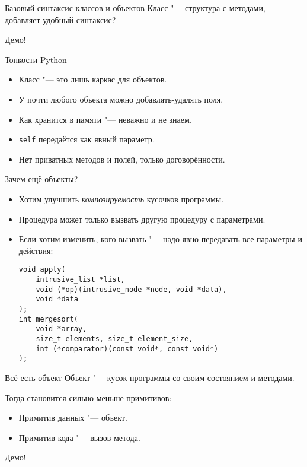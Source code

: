 \begin{frame}[t]{Базовый синтаксис классов и объектов}
Класс "--- структура с методами, добавляет удобный синтаксис?

Демо!
\end{frame}

\begin{frame}[t]{Тонкости Python}
\begin{itemize}
\item Класс "--- это лишь каркас для объектов.
\item У почти любого объекта можно добавлять-удалять поля.
\item Как хранится в памяти "--- неважно и не знаем.
\item \texttt{self} передаётся как явный параметр.
\item Нет приватных методов и полей, только договорённости.
\end{itemize}
\end{frame}

\begin{frame}[t,fragile]{Зачем ещё объекты?}
\begin{itemize}
\item Хотим улучшить \textit{композируемость} кусочков программы.
\item Процедура может только вызвать другую процедуру с параметрами.
\item Если хотим изменить, кого вызвать "--- надо явно передавать все параметры и действия:
\begin{verbatim}
void apply(
    intrusive_list *list,
    void (*op)(intrusive_node *node, void *data),
    void *data
);
int mergesort(
    void *array,
    size_t elements, size_t element_size,
    int (*comparator)(const void*, const void*)
);
\end{verbatim}
\end{itemize}
\end{frame}

\begin{frame}[t]{Всё есть объект}
Объект "--- кусок программы со своим состоянием и методами.

Тогда становится сильно меньше примитивов:
\begin{itemize}
	\item Примитив данных "--- объект.
	\item Примитив кода "--- вызов метода.
\end{itemize}

Демо!
\end{frame}

